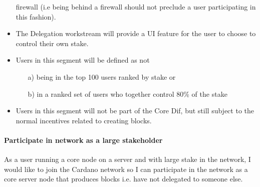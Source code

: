 \documentclass{report}
\theoremstyle{definition}{
  \newtheorem{lemma}{Lemma}[section] %
  \newtheorem{definition}[lemma]{Definition}
}
\theoremstyle{theorem}{
  \newtheorem{invariant}[lemma]{Invariant}
  \newtheorem{proofobligation}[lemma]{Proof Obligation}
}
\numberwithin{equation}{lemma}
\begin{document}
\begin{itemize}
      firewall (i.e being behind a firewall should not preclude a user
      participating in this fashion).
\item The Delegation workstream will provide a UI feature for the user to
      choose to control their own stake.
\item Users in this segment will be defined as {\sc not}
      \begin{itemize}
      \item[a)] being in the top 100 users ranked by stake or
      \item[b)] in a ranked set of users who together control 80\% of the stake
      \end{itemize}
\item Users in this segment will not be part of the Core Dif, but still
      subject to the normal incentives related to creating blocks.
\end{itemize}


\paragraph{Participate in network as a large stakeholder}

As a user running a core node on a server and with large stake in the network,
I would like to join the Cardano network so I can participate in the network as
a core server node that produces blocks i.e. have not delegated to someone else.
\end{document}

